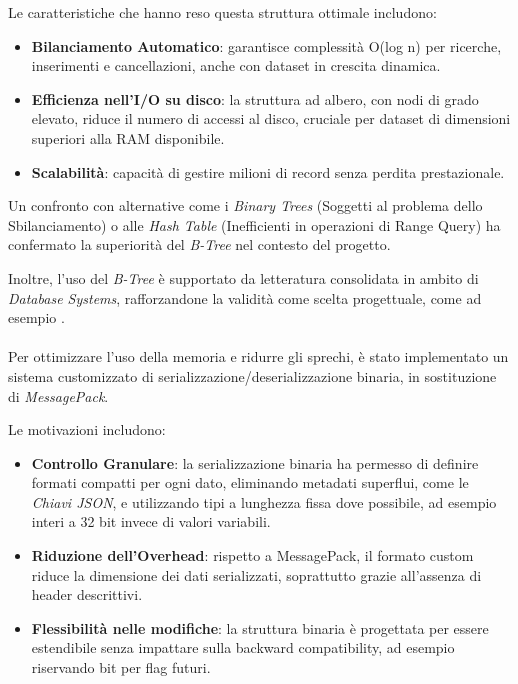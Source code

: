 \documentclass[12pt,a4paper,openright,twoside]{book}
\begin{document}
        Le caratteristiche che hanno reso questa struttura ottimale includono:

        \begin{itemize}
            \item \textbf{Bilanciamento Automatico}: garantisce complessità O(log n) per ricerche, inserimenti e cancellazioni, anche con dataset in crescita dinamica.
            \item \textbf{Efficienza nell’I/O su disco}: la struttura ad albero, con nodi di grado elevato, riduce il numero di accessi al disco, cruciale per dataset di dimensioni superiori alla RAM disponibile.
            \item \textbf{Scalabilità}: capacità di gestire milioni di record senza perdita prestazionale.
        \end{itemize}

        Un confronto con alternative come i \textit{Binary Trees} (Soggetti al problema dello Sbilanciamento) o alle \textit{Hash Table} (Inefficienti in operazioni di Range Query) ha confermato la superiorità del \textit{B-Tree} nel contesto del progetto.

        Inoltre, l’uso del \textit{B-Tree} è supportato da letteratura consolidata in ambito di \textit{Database Systems}, rafforzandone la validità come scelta progettuale, come ad esempio \cite{mostafa2020case}.

        \paragraph*{}

        Per ottimizzare l’uso della memoria e ridurre gli sprechi, è stato implementato un sistema customizzato di serializzazione/deserializzazione binaria, in sostituzione di \textit{MessagePack}.

        \pagebreak

        Le motivazioni includono:
        \begin{itemize}
            \item \textbf{Controllo Granulare}: la serializzazione binaria ha permesso di definire formati compatti per ogni dato, eliminando metadati superflui, come le \textit{Chiavi JSON}, e utilizzando tipi a lunghezza fissa dove possibile, ad esempio interi a 32 bit invece di valori variabili.
            \item \textbf{Riduzione dell’Overhead}: rispetto a MessagePack, il formato custom riduce la dimensione dei dati serializzati, soprattutto grazie all’assenza di header descrittivi.
            \item \textbf{Flessibilità nelle modifiche}: la struttura binaria è progettata per essere estendibile senza impattare sulla backward compatibility, ad esempio riservando bit per flag futuri.
        \end{itemize}
\end{document}
